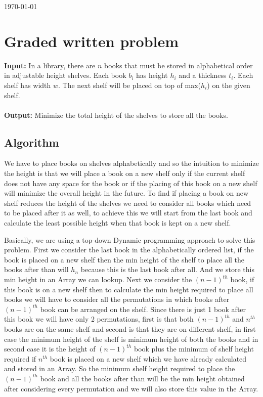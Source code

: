 \documentclass[8pt]{article}
\begin{document}
\hfill \small{\today} \\
\setlength{\fboxrule}{.5mm}\setlength{\fboxsep}{1.2mm}
\newlength{\boxlength}\setlength{\boxlength}{\textwidth}
\addtolength{\boxlength}{-4mm}
\begin{center}\end{center}
\vspace{5mm}

\section{Graded written problem}

\textbf{Input:} In a library, there are $n$ books that must be stored in alphabetical order in adjustable height shelves. Each book $b_i$ has height $h_i$ and a thickness $t_i$. Each shelf has width $w$. The next shelf will be placed on top of max($h_i$) on the given shelf.
\\ \\
\textbf{Output:} Minimize the total height of the shelves to store all the books.

\subsection{Algorithm}
We have to place books on shelves alphabetically and so the intuition to minimize the height is that we will place a book on a new shelf only if the current shelf does not have any space for the book or if the placing of this book on a new shelf will minimize the overall height in the future. To find if placing a book on new shelf reduces the height of the shelves we need to consider all books which need to be placed after it as well, to achieve this we will start from the last book and calculate the least possible height when that book is kept on a new shelf.

Basically, we are using a top-down Dynamic programming approach to solve this problem. First we consider the last book in the alphabetically ordered list, if the book is placed on a new shelf then the min height of the shelf to place all the books after than will $h_n$ because this is the last book after all. And we store this min height in an Array we can lookup. Next we consider the $(n - 1)^{th}$ book, if this book is on a new shelf then to calculate the min height required to place all books we will have to consider all the permutations in which books after $(n - 1)^{th}$ book can be arranged on the shelf. Since there is just 1 book after this book we will have only 2 permutations, first is that both $(n-1)^{th}$ and $n^{th}$ books are on the same shelf and second is that they are on different shelf, in first case the minimum height of the shelf is minimum height of both the books and in second case it is the height of $(n - 1)^{th}$ book plus the minimum of shelf height required if $n^{th}$ book is placed on a new shelf which we have already calculated and stored in an Array. So the minimum shelf height required to place the $(n - 1)^{th}$ book and all the books after than will be the min height obtained after considering every permutation and we will also store this value in the Array.
\end{document}
